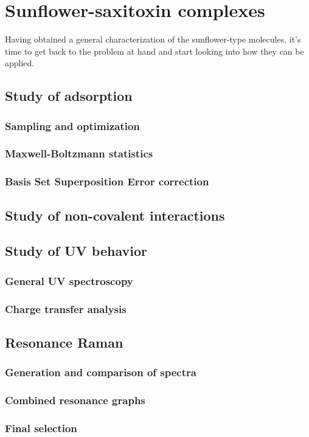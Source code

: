 \chapter{Sunflower-saxitoxin complexes}

Having obtained a general characterization of the sunflower-type molecules, it's time to get back to the problem at hand and start looking into how they can be applied.

\section{Study of adsorption}
\blindtext
\subsection{Sampling and optimization}
\blindtext
\subsection{Maxwell-Boltzmann statistics}
\blindtext
\subsection{Basis Set Superposition Error correction}
\blindtext

\section{Study of non-covalent interactions}
\blindtext

\section{Study of UV behavior}
\blindtext
\subsection{General UV spectroscopy}
\blindtext
\subsection{Charge transfer analysis}
\blindtext

\section{Resonance Raman}
\blindtext
\subsection{Generation and comparison of spectra}
\blindtext
\subsection{Combined resonance graphs}
\blindtext
\subsection{Final selection}
\blindtext
